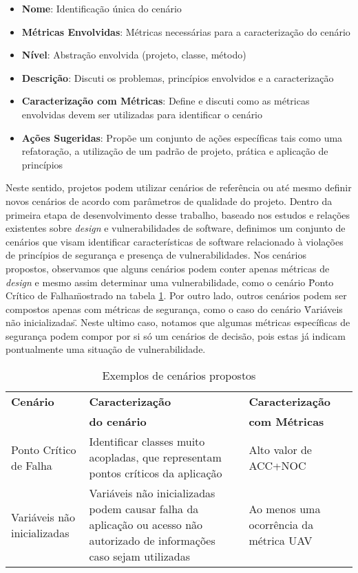 \begin{itemize}
\item \textbf{Nome}: Identificação única do cenário
\item \textbf{Métricas Envolvidas}: Métricas necessárias para a caracterização do cenário
\item \textbf{Nível}: Abstração envolvida (projeto, classe, método)
\item \textbf{Descrição}: Discuti os problemas, princípios envolvidos e a caracterização
\item \textbf{Caracterização com Métricas}: Define e discuti como as métricas envolvidas devem ser utilizadas para identificar o cenário
\item \textbf{Ações Sugeridas}: Propõe um conjunto de ações específicas tais como uma refatoração, a utilização de um padrão de projeto, prática e aplicação de princípios
\end{itemize}


Neste sentido, projetos podem utilizar cenários de referência ou até mesmo definir novos cenários de acordo com parâmetros de qualidade do projeto. Dentro da primeira etapa de desenvolvimento desse trabalho, baseado nos estudos e relações existentes sobre \emph{design} e vulnerabilidades de software, definimos um conjunto de cenários que visam identificar características de software relacionado à violações de princípios de segurança e presença de vulnerabilidades. Nos cenários propostos, observamos que alguns cenários podem conter apenas métricas de \emph{design} e mesmo assim determinar uma vulnerabilidade, como o cenário \"Ponto Crítico de Falha\" mostrado na tabela \ref{tab:resumo2}. Por outro lado, outros cenários podem ser compostos apenas com métricas de segurança, como o caso do cenário \"Variáveis não inicializadas\". Neste ultimo caso, notamos que algumas métricas específicas de segurança podem compor por si só um cenários de decisão, pois estas já indicam pontualmente uma situação de vulnerabilidade.

	\begin{table}[h!]
		\begin{center}
	    \begin{tabular}{ |p{2cm}| p{3cm} | p{2cm} |}
	    \hline
	    \textbf{Cenário} & \textbf{Caracterização} & \textbf{Caracterização} \\
	      & \textbf{do cenário}  & \textbf{com Métricas}  \\ 	\hline
	    
	    Ponto Crítico de Falha & Identificar classes muito acopladas, que representam pontos críticos da aplicação & Alto valor de ACC+NOC \\
	 \hline
	    Variáveis não inicializadas  & Variáveis não inicializadas podem causar falha da aplicação ou acesso não autorizado de informações caso sejam utilizadas & Ao menos uma ocorrência da métrica UAV  \\ \hline

	    \end{tabular}
		    \caption{Exemplos de cenários propostos}
		    \label{tab:resumo2}
		\end{center}
	\end{table}

